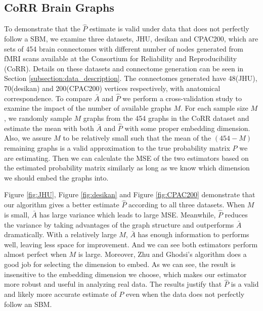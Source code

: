\subsection{CoRR Brain Graphs}
\label{subsection:real_data}

To demonstrate that the $\hat{P}$ estimate is valid under data that does not perfectly follow a SBM, we examine three datasets, JHU, desikan and CPAC200, which are sets of 454 brain connectomes with different number of nodes generated from fMRI scans available at the Consortium for Reliability and Reproducibility (CoRR). Details on these datasets and connectome generation can be seen in Section \ref{subsection:data_description}.  The connectomes generated have 48(JHU), 70(desikan) and 200(CPAC200) vertices respectively, with anatomical correspondence. To compare $\bar{A}$ and $\hat{P}$ we perform a cross-validation study to examine the impact of the number of available graphs $M$.  For each sample size $M$, we randomly sample $M$ graphs from the 454 graphs in the CoRR dataset and estimate the mean with both $\bar{A}$ and $\hat{P}$ with some proper embedding dimension.  Also, we assure $M$ to be relatively small such that the mean of the $(454 - M)$ remaining graphs is a valid approximation to the true probability matrix $P$ we are estimating. Then we can calculate the MSE of the two estimators based on the estimated probability matrix similarly as long as we know which dimension we should embed the graphs into.

Figure \ref{fig:JHU}, Figure \ref{fig:desikan} and Figure \ref{fig:CPAC200} demonstrate that our algorithm gives a better estimate $\hat{P}$ according to all three datasets. 
When $M$ is small, $\bar{A}$ has large variance which leads to large MSE. Meanwhile, $\hat{P}$ reduces the variance by taking advantages of the graph structure and outperforms $\bar{A}$ dramatically. With a relatively large $M$, $\bar{A}$ has enough information to performs well, leaving less space for improvement. And we can see both estimators perform almost perfect when $M$ is large.
Moreover, Zhu and Ghodsi's algorithm does a good job for selecting the dimension to embed. As we can see, the result is insensitive to the embedding dimension we choose, which makes our estimator more robust and useful in analyzing real data.
The results justify that $\hat{P}$ is a valid and likely more accurate estimate of $P$ even when the data does not perfectly follow an SBM.

